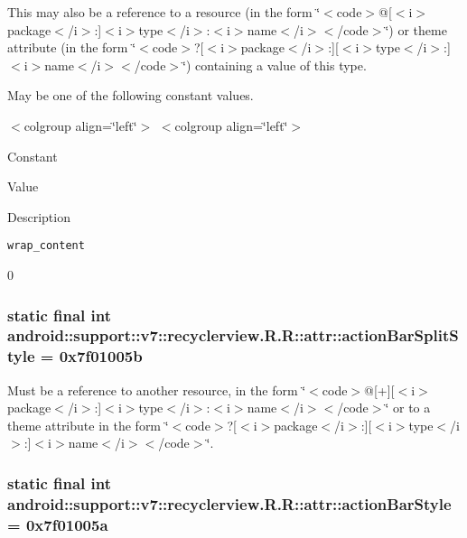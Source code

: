 This may also be a reference to a resource (in the form \char`\"{}$<$code$>$@\mbox{[}$<$i$>$package$<$/i$>$:\mbox{]}$<$i$>$type$<$/i$>$:$<$i$>$name$<$/i$>$$<$/code$>$\char`\"{}) or theme attribute (in the form \char`\"{}$<$code$>$?\mbox{[}$<$i$>$package$<$/i$>$:\mbox{]}\mbox{[}$<$i$>$type$<$/i$>$:\mbox{]}$<$i$>$name$<$/i$>$$<$/code$>$\char`\"{}) containing a value of this type. 

May be one of the following constant values. \begin{TabularC}{0}
\hline
\end{TabularC}
$<$colgroup align=\char`\"{}left\char`\"{}$>$ $<$colgroup align=\char`\"{}left\char`\"{}$>$ 

Constant

Value

Description 

{\tt wrap\_\-content}

0\hypertarget{classandroid_1_1support_1_1v7_1_1recyclerview_1_1_r_1_1attr_fd2393d3d3d7b75789dcc023abac3bc3}{
\subsubsection[{actionBarSplitStyle}]{\setlength{\rightskip}{0pt plus 5cm}static final int android::support::v7::recyclerview.R.R::attr::actionBarSplitStyle = 0x7f01005b}}
\label{classandroid_1_1support_1_1v7_1_1recyclerview_1_1_r_1_1attr_fd2393d3d3d7b75789dcc023abac3bc3}


Must be a reference to another resource, in the form \char`\"{}$<$code$>$@\mbox{[}+\mbox{]}\mbox{[}$<$i$>$package$<$/i$>$:\mbox{]}$<$i$>$type$<$/i$>$:$<$i$>$name$<$/i$>$$<$/code$>$\char`\"{} or to a theme attribute in the form \char`\"{}$<$code$>$?\mbox{[}$<$i$>$package$<$/i$>$:\mbox{]}\mbox{[}$<$i$>$type$<$/i$>$:\mbox{]}$<$i$>$name$<$/i$>$$<$/code$>$\char`\"{}. \hypertarget{classandroid_1_1support_1_1v7_1_1recyclerview_1_1_r_1_1attr_3aee379822bd15fa1f3e4c52563fff25}{
\subsubsection[{actionBarStyle}]{\setlength{\rightskip}{0pt plus 5cm}static final int android::support::v7::recyclerview.R.R::attr::actionBarStyle = 0x7f01005a}}
\label{classandroid_1_1support_1_1v7_1_1recyclerview_1_1_r_1_1attr_3aee379822bd15fa1f3e4c52563fff25}


